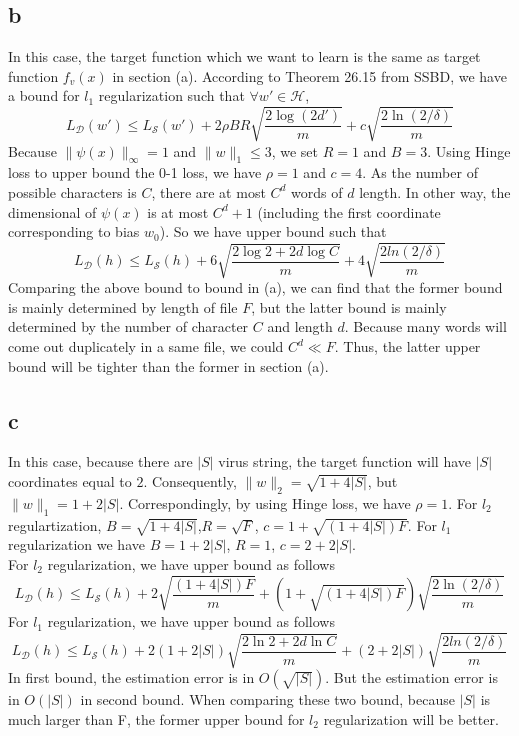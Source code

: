 \documentclass{article}
\begin{document}
	\subsection{b}
	In this case, the target function which we want to learn is the same as target function $f_v(x)$ in section (a).
	According to Theorem 26.15 from SSBD, we have a bound for $l_1$ regularization such that $\forall w' \in \mathcal{H}$,
	$$L_{\mathcal{D}}(w') \leq L_{\mathcal{S}}(w') + 2\rho BR \sqrt{\frac{2\log(2d')}{m}}+c\sqrt{\frac{2\ln(2/\delta)}{m}}
	$$
	Because $\|\psi(x)\|_{\infty}=1$ and $\|w\|_1 \leq 3$, we set $R=1$ and $B=3$. Using Hinge loss to upper bound the 0-1 loss, we have $\rho=1$ and $c=4$. As the number of possible characters is $C$, there are at most $C^d$ words of $d$ length. In other way, the dimensional of $\psi(x)$ is at most $C^d+1$ (including the first coordinate corresponding to bias $w_0$). So we have upper bound such that
	$$
	L_{\mathcal{D}}(h) \leq L_{\mathcal{S}}(h) + 6\sqrt{\frac{2\log2+2d\log C}{m}} + 4\sqrt{\frac{2ln(2/\delta)}{m}}
	$$
	Comparing the above bound to bound in (a), we can find that the former bound is mainly determined by length of file $F$, but the latter bound is mainly determined by the number of character $C$ and length $d$. Because many words will come out duplicately in a same file, we could $C^d \ll F$. Thus, the latter upper bound will be tighter than the former in section (a).

	\subsection{c}
	In this case, because there are $|S|$ virus string, the target function will have $|S|$ coordinates equal to $2$. Consequently, $\|w\|_2=\sqrt{1+4|S|}$, but $\|w\|_1=1+2|S|$. Correspondingly, by using Hinge loss, we have $\rho=1$. For $l_2$ regulartization, $B=\sqrt{1+4|S|}$,$R=\sqrt{F}$, $c=1+\sqrt{(1+4|S|)F}$. For $l_1$ regularization we have $B=1+2|S|$, $R=1$, $c=2+2|S|$.\\
	For $l_2$ regularization, we have upper bound as follows
	$$
	L_{\mathcal{D}}(h) \leq L_{\mathcal{S}}(h) + 2\sqrt{\frac{(1+4|S|)F}{m}}+(1+\sqrt{(1+4|S|)F})\sqrt{\frac{2\ln(2/\delta)}{m}}
	$$	
	For $l_1$ regularization, we have upper bound as follows
	$$
	L_{\mathcal{D}}(h) \leq L_{\mathcal{S}}(h) + 2(1+2|S|)\sqrt{\frac{2\ln2+2d\ln C}{m}} + (2+2|S|)\sqrt{\frac{2ln(2/\delta)}{m}}
	$$
	In first bound, the estimation error is in $O(\sqrt{|S|})$. But the estimation error is in $O(|S|)$ in second bound. When comparing these two bound, because $|S|$ is much larger than F, the former upper bound for $l_2$ regularization will be better.
\end{document}
